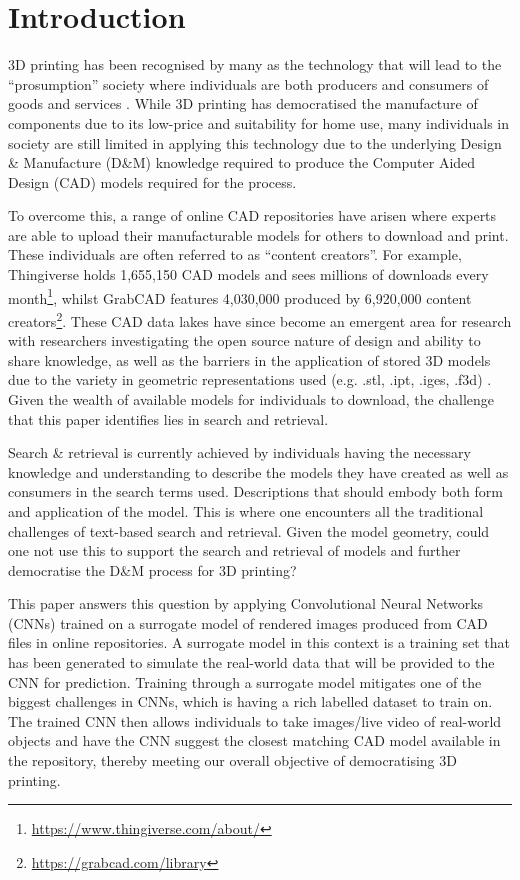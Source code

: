 \documentclass[a4paper, 11pt]{article}
\begin{document}


\section{Introduction}

3D printing has been recognised by many as the technology that will lead to the ``prosumption'' society where individuals are both producers and consumers of goods and services \parencite{hermans2015}. While 3D printing has democratised the manufacture of components due to its low-price and suitability for home use, many individuals in society are still limited in applying this technology due to the underlying Design \& Manufacture (D\&M) knowledge required to produce the Computer Aided Design (CAD) models required for the process.

To overcome this, a range of online CAD repositories have arisen where experts are able to upload their manufacturable models for others to download and print. These individuals are often referred to as ``content creators''. For example, Thingiverse holds 1,655,150 CAD models and sees millions of downloads every month\footnote{\url{https://www.thingiverse.com/about/}}, whilst GrabCAD features 4,030,000 produced by 6,920,000 content creators\footnote{\url{https://grabcad.com/library}}.
These CAD data lakes have since become an emergent area for research with researchers investigating the open source nature of design and ability to share knowledge, as well as the barriers in the application of stored 3D models due to the variety in geometric representations used (e.g. .stl, .ipt, .iges, .f3d) \parencite{buehler2015,baumann2018,alcock2016}.
Given the wealth of available models for individuals to download, the challenge that this paper identifies lies in search and retrieval.

Search \& retrieval is currently achieved by individuals having the necessary knowledge and understanding to describe the models they have created as well as consumers in the search terms used. Descriptions that should embody both form and application of the model. This is where one encounters all the traditional challenges of text-based search and retrieval. Given the model geometry, could one not use this to support the search and retrieval of models and further democratise the D\&M process for 3D printing?

This paper answers this question by applying Convolutional Neural Networks (CNNs) trained on a surrogate model of rendered images produced from CAD files in online repositories. A surrogate model in this context is a training set that has been generated to simulate the real-world data that will be provided to the CNN for prediction. Training through a surrogate model mitigates one of the biggest challenges in CNNs, which is having a rich labelled dataset to train on. The trained CNN then allows individuals to take images/live video of real-world objects and have the CNN suggest the closest matching CAD model available in the repository, thereby meeting our overall objective of democratising 3D printing.
\end{document}
